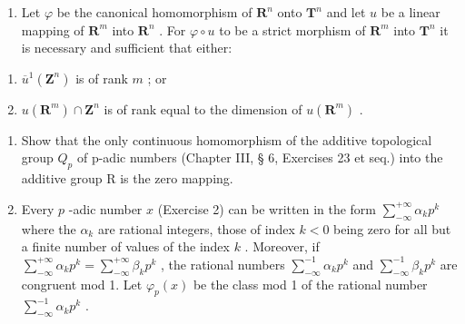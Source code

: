 \ExerciseSection

\begin{enumerate}
\def\labelenumi{\arabic{enumi})}
\tightlist
\item
  Let \(\varphi\) be the canonical homomorphism of \(\mathbf{R}^n\) onto \(\mathbf{T}^n\) and let \(u\) be a linear mapping of \(\mathbf{R}^m\) into \(\mathbf{R}^n\) . For \(\varphi \circ u\) to be a strict morphism of \(\mathbf{R}^m\) into \(\mathbf{T}^n\) it is necessary and sufficient that either:
\end{enumerate}

\begin{enumerate}
\def\labelenumi{\alph{enumi})}
\item
  \(\overline{u}^1 (\mathbf{Z}^n)\) is of rank \(m\) ; or
\item
  \(u(\mathbf{R}^m)\cap \mathbf{Z}^n\) is of rank equal to the dimension of \(u(\mathbf{R}^m)\) .
\end{enumerate}

\begin{enumerate}
\def\labelenumi{\arabic{enumi})}
\setcounter{enumi}{1}
\item
  Show that the only continuous homomorphism of the additive topological group \(Q_{p}\) of p-adic numbers (Chapter III, § 6, Exercises 23 et seq.) into the additive group R is the zero mapping.
\item
  Every \(p\) -adic number \(x\) (Exercise 2) can be written in the form \(\sum_{-\infty}^{+\infty} \alpha_k p^k\) where the \(\alpha_k\) are rational integers, those of index \(k < 0\) being zero for all but a finite number of values of the index \(k\) . Moreover, if \(\sum_{-\infty}^{+\infty} \alpha_k p^k = \sum_{-\infty}^{+\infty} \beta_k p^k\) , the rational numbers \(\sum_{-\infty}^{-1} \alpha_k p^k\) and \(\sum_{-\infty}^{-1} \beta_k p^k\) are congruent mod 1. Let \(\varphi_p(x)\) be the class mod 1 of the rational number \(\sum_{-\infty}^{-1} \alpha_k p^k\) .\\
\end{enumerate}

